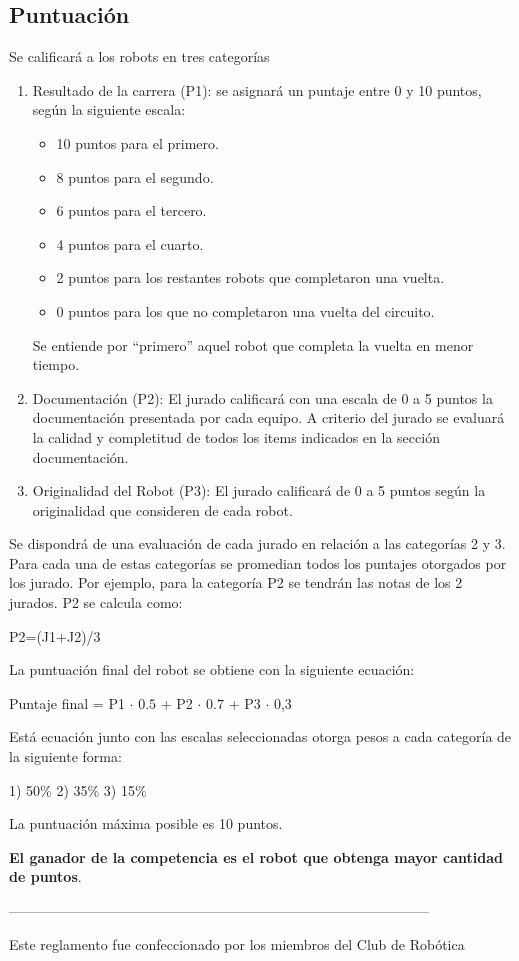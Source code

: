 \documentclass[a4paper,11pt]{article}
\begin{document}
\subsection*{Puntuación}
Se calificará a los robots en tres categorías
\begin{enumerate}
  \item Resultado de la carrera (P1): se asignará un puntaje entre 0 y 10 puntos, según la siguiente escala:
  \begin{itemize}
    \item 10 puntos para el primero.
    \item  8 puntos para el segundo.
    \item  6 puntos para el tercero.
    \item  4 puntos para el cuarto.
    \item  2 puntos para los restantes robots que completaron una vuelta.
    \item  0 puntos para los que no completaron una vuelta del circuito.
  \end{itemize}    
    Se entiende por ``primero'' aquel robot que completa la vuelta en menor tiempo.

  \item Documentación (P2): El jurado calificará con una escala de 0 a 5 puntos la documentación presentada por cada equipo.
  A criterio del jurado se evaluará la calidad y completitud de todos los items indicados en la sección documentación.

  \item Originalidad del Robot (P3): El jurado calificará de 0 a 5 puntos según la originalidad que consideren de cada robot.
\end{enumerate}

Se dispondrá de una evaluación de cada jurado en relación a las categorías 2 y 3. Para cada una de estas categorías se promedian todos los puntajes otorgados por los jurado. Por ejemplo, para la categoría P2 se tendrán las notas de los 2 jurados. P2 se calcula como:

\begin{center}
P2=(J1+J2)/3
\end{center}

La puntuación final del robot se obtiene con la siguiente ecuación:

\begin{center}
Puntaje final = P1 $\cdot$ $0.5$ + P2 $\cdot$ $0.7$ + P3 $\cdot$ 0,3
\end{center}

Está ecuación junto con las escalas seleccionadas otorga pesos a cada categoría de la siguiente forma:

1) 50\%  2) 35\%  3) 15\%

La puntuación máxima posible es 10 puntos.

\textbf{El ganador de la competencia es el robot que obtenga mayor cantidad de puntos}.

------------------------------------------------------------------------------------------

Este reglamento fue confeccionado por los miembros del Club de Robótica
\end{document}
